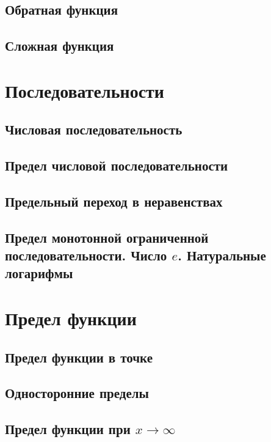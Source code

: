 \documentclass[14pt]{extreport}
\begin{document}
\section{Обратная функция}

\section{Сложная функция}



\chapter{Последовательности}

\section{Числовая последовательность}

\section{Предел числовой последовательности}

\section{Предельный переход в неравенствах}

\section{Предел монотонной ограниченной последовательности. Число $e$. Натуральные логарифмы}



\chapter{Предел функции}

\section{Предел функции в точке}

\section{Односторонние пределы}

\section{Предел функции при $x\to\infty$}
\end{document}
